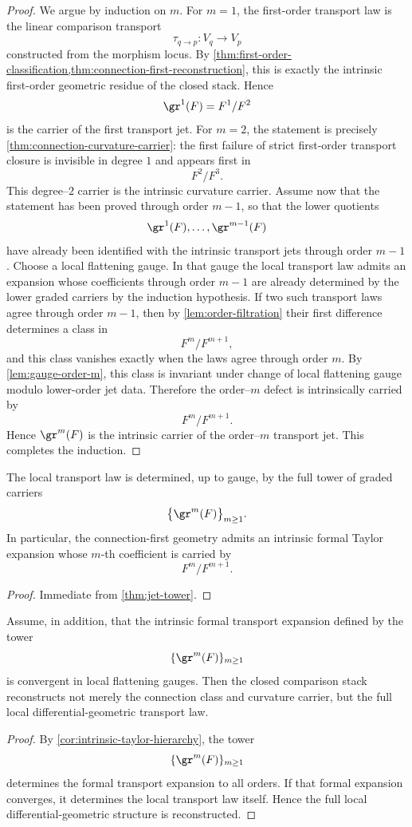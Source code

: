 \begin{proof}
	We argue by induction on \(m\).
	For \(m=1\), the first-order transport law is the linear comparison
	transport
	\[
		\tau_{q\to p}:V_q\to V_p
	\]
	constructed from the morphism locus.  By
	\cref{thm:first-order-classification,thm:connection-first-reconstruction},
	this is exactly the intrinsic first-order geometric residue of the
	closed stack.  Hence
	\[
		\gr^1(F)=F^1/F^2
	\]
	is the carrier of the first transport jet.
	For \(m=2\), the statement is precisely
	\cref{thm:connection-curvature-carrier}: the first failure of strict
	first-order transport closure is invisible in degree \(1\) and appears
	first in
	\[
		F^2/F^3.
	\]
	This degree--\(2\) carrier is the intrinsic curvature carrier.
	Assume now that the statement has been proved through order \(m-1\), so
	that the lower quotients
	\[
		\gr^1(F),\dots,\gr^{m-1}(F)
	\]
	have already been identified with the intrinsic transport jets through
	order \(m-1\).
	Choose a local flattening gauge.  In that gauge the local transport law
	admits an expansion whose coefficients through order \(m-1\) are already
	determined by the lower graded carriers by the induction hypothesis.  If
	two such transport laws agree through order \(m-1\), then by
	\cref{lem:order-filtration} their first difference determines a class in
	\[
		F^m/F^{m+1},
	\]
	and this class vanishes exactly when the laws agree through order \(m\).
	By \cref{lem:gauge-order-m}, this class is invariant under change of
	local flattening gauge modulo lower-order jet data.  Therefore the
	order--\(m\) defect is intrinsically carried by
	\[
		F^m/F^{m+1}.
	\]
	Hence \(\gr^m(F)\) is the intrinsic carrier of the order--\(m\)
	transport jet.  This completes the induction.
\end{proof}
\begin{corollary}
	\label{cor:intrinsic-taylor-hierarchy}
	The local transport law is determined, up to gauge, by the full tower of
	graded carriers
	\[
		\bigl\{\gr^m(F)\bigr\}_{m\ge 1}.
	\]
	In particular, the connection-first geometry admits an intrinsic formal
	Taylor expansion whose \(m\)-th coefficient is carried by
	\[
		F^m/F^{m+1}.
	\]
\end{corollary}
\begin{proof}
	Immediate from \cref{thm:jet-tower}.
\end{proof}
\begin{corollary}
	Assume, in addition, that the intrinsic formal transport expansion
	defined by the tower
	\[
		\{\gr^m(F)\}_{m\ge 1}
	\]
	is convergent in local flattening gauges.  Then the closed comparison
	stack reconstructs not merely the connection class and curvature
	carrier, but the full local differential-geometric transport law.
\end{corollary}
\begin{proof}
	By \cref{cor:intrinsic-taylor-hierarchy}, the tower
	\[
		\{\gr^m(F)\}_{m\ge 1}
	\]
	determines the formal transport expansion to all orders.  If that
	formal expansion converges, it determines the local transport law
	itself.  Hence the full local differential-geometric structure is
	reconstructed.
\end{proof}
